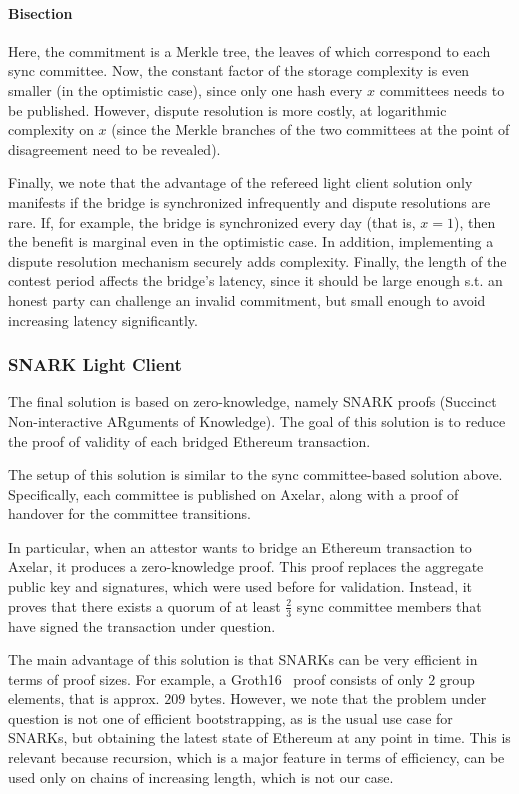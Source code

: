 \paragraph{Bisection}
Here, the commitment is a Merkle tree, the leaves of which correspond to each
sync committee. Now, the constant factor of the storage complexity is even
smaller (in the optimistic case), since only one hash every $x$ committees
needs to be published. However, dispute resolution is more costly, at
logarithmic complexity on $x$ (since the Merkle branches of the two committees
at the point of disagreement need to be revealed).

Finally, we note that the advantage of the refereed light client solution only
manifests if the bridge is synchronized infrequently and dispute resolutions
are rare. If, for example, the bridge is synchronized every day (that is, $x =
1$), then the benefit is marginal even in the optimistic case. In addition,
implementing a dispute resolution mechanism securely adds complexity. Finally,
the length of the contest period affects the bridge's latency, since it should
be large enough s.t. an honest party can challenge an invalid commitment, but
small enough to avoid increasing latency significantly.

\subsubsection{SNARK Light Client}

The final solution is based on zero-knowledge, namely SNARK proofs (Succinct
Non-interactive ARguments of Knowledge). The goal of this solution is to reduce
the proof of validity of each bridged Ethereum transaction.

The setup of this solution is similar to the sync committee-based solution
above. Specifically, each committee is published on Axelar, along with a proof
of handover for the committee transitions. 

In particular, when an attestor wants to bridge an Ethereum transaction to
Axelar, it produces a zero-knowledge proof. This proof replaces the aggregate
public key and signatures, which were used before for validation. Instead, it
proves that there exists a quorum of at least $\frac{2}{3}$ sync committee
members that have signed the transaction under question.

The main advantage of this solution is that SNARKs can be very efficient in
terms of proof sizes. For example, a Groth16~\cite{EC:Groth16} proof consists
of only $2$ group elements, that is approx. $209$ bytes. However, we note that
the problem under question is not one of efficient bootstrapping, as is the
usual use case for SNARKs, but obtaining the latest state of Ethereum at any
point in time. This is relevant because recursion, which is a major feature in
terms of efficiency, can be used only on chains of increasing length, which is
not our case.

